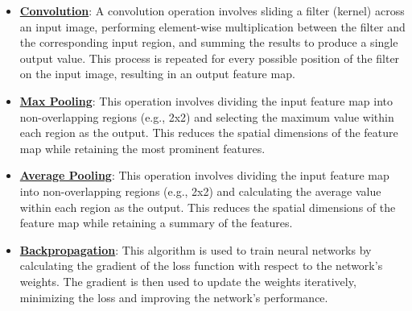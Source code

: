 \documentclass{article}%
\begin{document}
\begin{itemize}[leftmargin=*]%
\item \href{https://purdue.brightspace.com/d2l/common/assets/pdfjs-d2l-dist/1.0.14-legacy/web/viewer.html?file=\%2Fcontent\%2Fenforced\%2F1095467-wl.202510.CS.24300.001\%2F09L1-cnn.pdf\%3Fou\%3D1095467\&lang=en-us\&container=d2l-fileviewer-rendered-pdf\&fullscreen=d2l-fileviewer-rendered-pdf-dialog\&height=667#page=6}{\textbf{Convolution}}: A convolution operation involves sliding a filter (kernel) across an input image, performing element-wise multiplication between the filter and the corresponding input region, and summing the results to produce a single output value. This process is repeated for every possible position of the filter on the input image, resulting in an output feature map.%
\item \href{https://purdue.brightspace.com/d2l/common/assets/pdfjs-d2l-dist/1.0.14-legacy/web/viewer.html?file=\%2Fcontent\%2Fenforced\%2F1095467-wl.202510.CS.24300.001\%2F09L1-cnn.pdf\%3Fou\%3D1095467\&lang=en-us\&container=d2l-fileviewer-rendered-pdf\&fullscreen=d2l-fileviewer-rendered-pdf-dialog\&height=667#page=14}{\textbf{Max Pooling}}: This operation involves dividing the input feature map into non-overlapping regions (e.g., 2x2) and selecting the maximum value within each region as the output. This reduces the spatial dimensions of the feature map while retaining the most prominent features.%
\item \href{https://purdue.brightspace.com/d2l/common/assets/pdfjs-d2l-dist/1.0.14-legacy/web/viewer.html?file=\%2Fcontent\%2Fenforced\%2F1095467-wl.202510.CS.24300.001\%2F09L1-cnn.pdf\%3Fou\%3D1095467\&lang=en-us\&container=d2l-fileviewer-rendered-pdf\&fullscreen=d2l-fileviewer-rendered-pdf-dialog\&height=667#page=15}{\textbf{Average Pooling}}: This operation involves dividing the input feature map into non-overlapping regions (e.g., 2x2) and calculating the average value within each region as the output. This reduces the spatial dimensions of the feature map while retaining a summary of the features.%
\item \href{https://purdue.brightspace.com/d2l/common/assets/pdfjs-d2l-dist/1.0.14-legacy/web/viewer.html?file=\%2Fcontent\%2Fenforced\%2F1095467-wl.202510.CS.24300.001\%2F09L1-cnn.pdf\%3Fou\%3D1095467\&lang=en-us\&container=d2l-fileviewer-rendered-pdf\&fullscreen=d2l-fileviewer-rendered-pdf-dialog\&height=667#page=16}{\textbf{Backpropagation}}: This algorithm is used to train neural networks by calculating the gradient of the loss function with respect to the network's weights. The gradient is then used to update the weights iteratively, minimizing the loss and improving the network's performance.%

\end{itemize}
\end{document}
